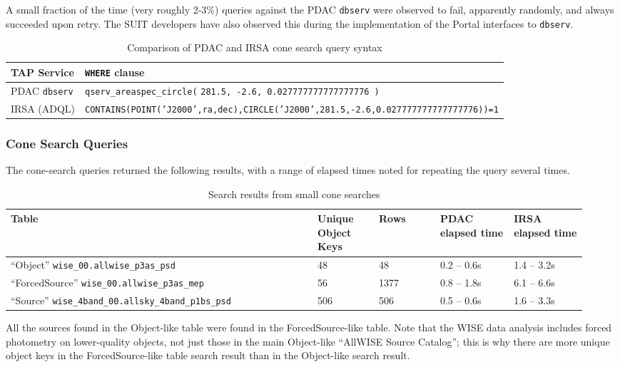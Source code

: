 \documentclass[DM,lsstdraft,STR,toc]{lsstdoc}
\begin{document}
A small fraction of the time (very roughly 2-3\%) queries against the PDAC \verb|dbserv| were observed to fail,
apparently randomly, and always succeeded upon retry.
The SUIT developers have also observed this during the implementation of the Portal interfaces to \verb|dbserv|.

\begin{table}[h]
\centering
\begin{tabular}{l l}
TAP Service & \texttt{WHERE} clause \\ \hline
PDAC \texttt{dbserv} & \verb|qserv_areaspec_circle(| \texttt{281.5, -2.6, 0.027777777777777776 )} \\
IRSA (ADQL) & \texttt{CONTAINS(POINT('J2000',ra,dec),CIRCLE('J2000',281.5,-2.6,0.027777777777777776))=1} \\
\end{tabular}
\caption{Comparison of PDAC and IRSA cone search query syntax}
\label{tab:conesyntax}
\end{table}

\subsubsection{Cone Search Queries}

The cone-search queries returned the following results, with a range of elapsed times noted for repeating the query several times.

\begin{table}[h]
\centering
\begin{tabular}{p{0.5 \linewidth} p{0.1 \linewidth} p{0.1 \linewidth} p{0.12 \linewidth} p{0.12 \linewidth}}
Table & Unique Object Keys & Rows & PDAC elapsed time & IRSA elapsed time \\ \hline
``Object'' \verb|wise_00.allwise_p3as_psd| & 48 & 48 & 0.2 -- 0.6s & 1.4 -- 3.2s \\
``ForcedSource'' \verb|wise_00.allwise_p3as_mep| & 56 & 1377 & 0.8 -- 1.8s & 6.1 -- 6.6s \\
``Source'' \verb|wise_4band_00.allsky_4band_p1bs_psd| & 506 & 506 & 0.5 -- 0.6s & 1.6 -- 3.3s \\
\end{tabular}
\caption{Search results from small cone searches}
\label{tab:coneresults}
\end{table}

All the sources found in the Object-like table were found in the ForcedSource-like table.
Note that the WISE data analysis includes forced photometry on lower-quality objects,
not just those in the main Object-like ``AllWISE Source Catalog'';
this is why there are more unique object keys in the ForcedSource-like table search result than in the Object-like search result.
\end{document}
